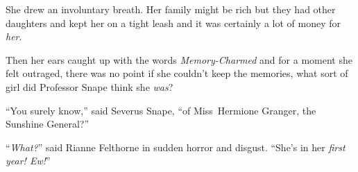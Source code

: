 She drew an involuntary breath. Her family might be rich but they had other daughters and kept her on a tight leash and it was certainly a lot of money for \emph{her}.

Then her ears caught up with the words \emph{Memory-Charmed} and for a moment she felt outraged, there was no point if she couldn’t keep the memories, what sort of girl did Professor Snape think she \emph{was}?

“You surely know,” said Severus Snape, “of Miss~Hermione Granger, the Sunshine General?”

“\emph{What?}” said Rianne Felthorne in sudden horror and disgust. “She’s in her \emph{first year! Ew!}”

